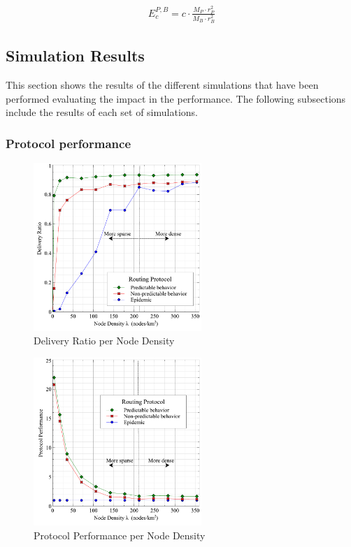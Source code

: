 \documentclass[conference]{IEEEtran}
\begin{document}
\begin{eqnarray}
\label{eq:EnergyConsumption}
E_c^{P,B} = c \cdot \frac{M_P \cdot r_P^2}{M_B \cdot r_B^2}
\end{eqnarray}



\subsection{Simulation Results}


This section shows the results of the different simulations that have been performed evaluating the impact in the performance.
The following subsections include the results of each set of simulations.

\subsubsection{Protocol performance}

\begin{figure}[!t]
	\centering
	\includegraphics[width=2.5in]{Graphs/DeliveryRatio.pdf}
	\caption{Delivery Ratio per Node Density}
	\label{Delivery Ratio per Node Density}
\end{figure}

\begin{figure}[!t]
\centering
\includegraphics[width=2.5in]{Graphs/ProtocolPerformance.pdf}
\caption{Protocol Performance per Node Density}
\label{Protocol Performance per Node Density}
\end{figure}
\end{document}
